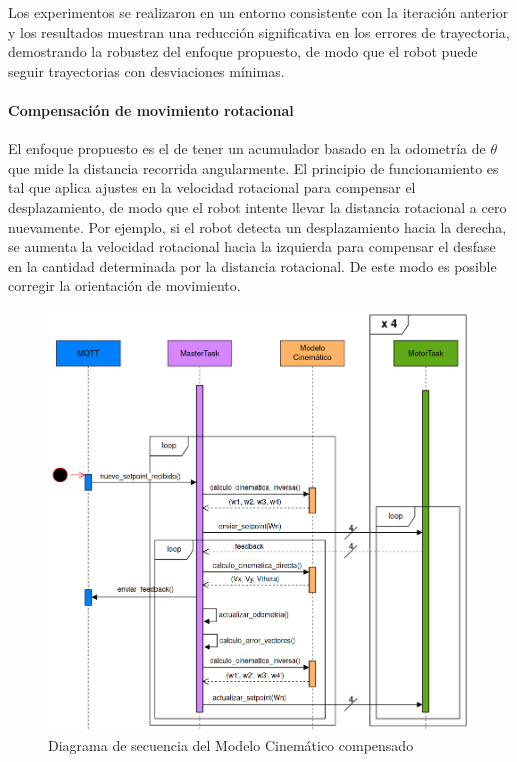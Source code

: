 Los experimentos se realizaron en un entorno consistente con la iteración anterior y los resultados muestran una reducción significativa en los errores de trayectoria, demostrando la robustez del enfoque propuesto, de modo que el robot puede seguir trayectorias con desviaciones mínimas.

\paragraph{Compensación de movimiento rotacional} \mbox{} \vspace{6pt}

El enfoque propuesto es el de tener un acumulador basado en la odometría de $\theta$ que mide la distancia recorrida angularmente. El principio de funcionamiento es tal que aplica ajustes en la velocidad rotacional para compensar el desplazamiento, de modo que el robot intente llevar la distancia rotacional a cero nuevamente. Por ejemplo, si el robot detecta un desplazamiento hacia la derecha, se aumenta la velocidad rotacional hacia la izquierda para compensar el desfase en la cantidad determinada por la distancia rotacional. De este modo es posible corregir la orientación de movimiento.

\begin{figure}[H]
    \centering
    \includegraphics[width=1\linewidth]{images/diag_secuencia_modelo_cinematico_compensado.png}
    \caption{Diagrama de secuencia del Modelo Cinemático compensado}
    \label{fig:diagsecuenciamodcinemcompens}
\end{figure}
